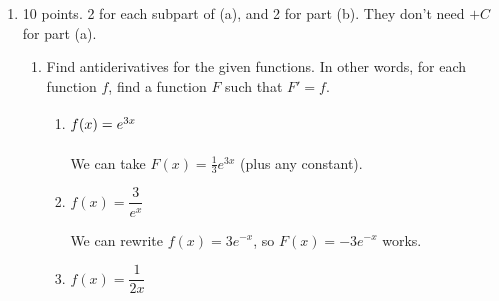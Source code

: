 \documentclass{article}
\begin{document}
\begin{enumerate}
\begin{enumerate}
    \item
      \begin{problem}[\vfill]
        $\displaystyle \int \frac{2\cos w}{3}\, dw$
      \end{problem}

      \begin{solution}
        $ \dfrac{2\sin w}{3} + C$ 
      \end{solution}

    \end{enumerate}    
  \probonly{}
  $\checkmark$ Remember that you can check your answers by
    differentiating them!

\item 

\begin{grading}
10 points. 2 for each subpart of (a), and 2 for part (b). They don't need $+C$ for part (a).
\end{grading}
  \begin{enumerate}
  \item
Find antiderivatives for the given functions. In other words, for each
    function $f$, find a function $F$ such that $F' = f$.

    \probonly{}
      \begin{enumerate}
      \item
        \begin{problem}[\vfill]
          $f(x) = e^{3x}\vphantom{\dfrac{1}{1}}$
        \end{problem}

        \begin{solution} %
          We can take $F(x) = \boxed{\frac{1}{3} e^{3x}}$ (plus any
          constant).
        \end{solution}

      \item
        \begin{problem}[\vfill]
          $f(x) = \dfrac{3}{e^x}$
        \end{problem}

        \begin{solution} %
          We can rewrite $f(x) = 3 e^{-x}$, so $F(x) = \boxed{-3 e^{-x}}$
          works.
        \end{solution}

      \item
        \begin{problem}[\vfill\newpage]
          $f(x) = \dfrac{1}{2x}$
        \end{problem}


\end{enumerate}
\end{enumerate}
\end{enumerate}
\end{document}

